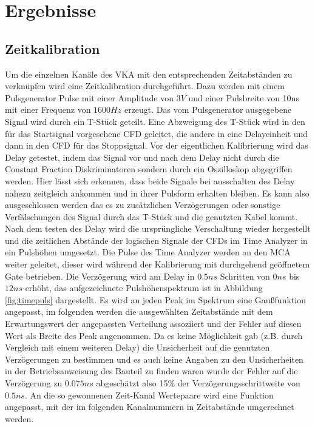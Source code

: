 \documentclass[a4paper,12pt]{article}
\begin{document}
\section{Ergebnisse}
	\subsection{Zeitkalibration}
		Um die einzelnen Kanäle des VKA mit den entsprechenden Zeitabständen zu verknüpfen wird eine Zeitkalibration durchgeführt. Dazu werden
		mit einem Pulsgenerator Pulse mit einer Amplitude von $3\si{V}$ und einer Pulsbreite von 10ns mit einer Frequenz von $1600\si{Hz}$ erzeugt.
		Das vom Pulsgenerator ausgegebene Signal wird durch ein T-Stück geteilt. Eine Abzweigung des T-Stück wird in den für das Startsignal vorgesehene 
		CFD geleitet, die andere in eine Delayeinheit und dann in den CFD für das Stoppsignal. Vor der eigentlichen Kalibrierung wird das Delay getestet, indem
		das Signal vor und nach dem Delay nicht durch die Constant Fraction Diskriminatoren sondern durch ein Oszilloskop abgegriffen werden. Hier lässt sich erkennen,
		dass beide Signale bei ausschalten des Delay nahezu zeitgleich ankommen und in ihrer Pulsform erhalten bleiben. Es kann also ausgeschlossen werden das es zu 
		zusätzlichen Verzögerungen oder sonstige Verfälschungen des Signal durch das T-Stück und die genutzten Kabel kommt.
		Nach dem testen des Delay wird die ursprüngliche Verschaltung wieder hergestellt und die zeitlichen Abstände der logischen Signale der CFDs im Time Analyzer
		in ein Pulshöhen umgesetzt. Die Pulse des Time Analyzer werden an den MCA weiter geleitet, dieser wird während der Kalibrierung mit
		durchgehend geöffnetem Gate betrieben. Die Verzögerung wird am Delay in $0.5\si{ns}$ Schritten von $0\si{ns}$ bis $12\si{ns}$ erhöht, das aufgezeichnete Pulshöhenspektrum 
		ist in Abbildung \ref{fig:timepuls} dargestellt. Es wird an jeden Peak im Spektrum eine Gaußfunktion angepasst, im folgenden werden die ausgewählten Zeitabstände mit
		dem Erwartungswert \mu der angepassten Verteilung assoziiert und der Fehler auf diesen Wert als Breite des Peak \sigma angenommen. Da es keine Möglichkeit gab 
		(z.B. durch Vergleich mit einem weiteren Delay) die Unsicherheit auf die genutzten Verzögerungen zu bestimmen und es auch keine Angaben zu
		den Unsicherheiten in der Betriebsanweisung des Bauteil zu finden waren wurde der Fehler auf die Verzögerung zu $0.075\si{ns}$ abgeschätzt also 
		15\% der Verzögerungsschrittweite von $0.5\si{ns}$. An die so gewonnenen Zeit-Kanal Wertepaare wird eine Funktion angepasst, mit der im folgenden 
		Kanalnummern in Zeitabstände umgerechnet werden. 
		
\end{document}
